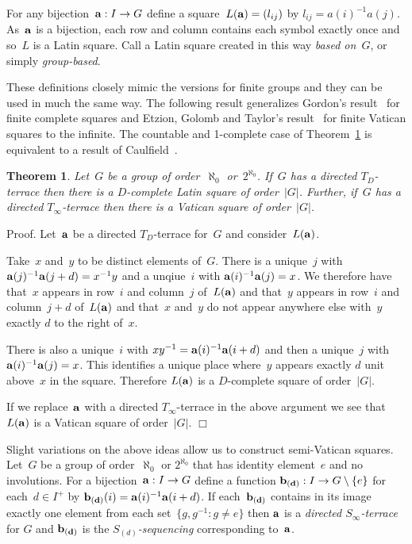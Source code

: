 \documentclass[12pt,a4paper]{article}
\newtheorem{thm}{Theorem}
\newcommand{\qed}{\unskip\protect\nolinebreak\mbox{\quad$\Box$}\vspace{3mm}}
\begin{document}
For any bijection~${\bf a}: I \rightarrow G$ define a square~$L({\bf a}) = (l_{ij})$ by $l_{ij} = a(i)^{-1}a(j)$.   As~${\bf a}$ is a bijection, each row and column contains each symbol exactly once and so~$L$ is a Latin square.  Call a Latin square created in this way {\em based on~$G$}, or simply {\em group-based}.
  
These definitions closely mimic the versions for finite groups and they can be used in much the same way.
The following result generalizes Gordon's result~\cite{Gordon61} for finite complete squares and Etzion, Golomb and Taylor's result~\cite{EGT89} for finite Vatican squares to the infinite.  The countable and 1-complete case of Theorem~\ref{th:gordon} is equivalent to a result of Caulfield~\cite{Caulfield96}.

\begin{thm}\label{th:gordon}
Let~$G$ be a group of order~$\aleph_0$ or~$2^{\aleph_0}$.  If~$G$ has a directed $T_{D}$-terrace then there is a $D$-complete Latin square of order~$|G|$.  Further, if~$G$ has a directed $T_{\infty}$-terrace then there is a Vatican square of order~$|G|$.
\end{thm}

\noindent
Proof.  Let~${\bf a}$ be a directed $T_D$-terrace for~$G$ and consider~$L({\bf a})$.  

Take~$x$ and~$y$ to be distinct elements of~$G$.  There is a unique~$j$ with ${\bf a}(j)^{-1}{\bf a}(j+d) = x^{-1}y$ and a unqiue~$i$ with ${\bf a}(i)^{-1}{\bf a}(j)=x$.  We therefore have that~$x$ appears in row~$i$ and column~$j$ of~$L({\bf a})$ and that~$y$ appears in row~$i$ and column~$j+d$ of~$L({\bf a})$ and that~$x$ and~$y$ do not appear anywhere else with~$y$ exactly $d$  to the right of~$x$.

There is also a unique~$i$ with $xy^{-1} = {\bf a}(i)^{-1}{\bf a}(i+d)$ and then a unique~$j$ with ${\bf a}(i)^{-1}{\bf a}(j)=x$.  This identifies a unique place where~$y$ appears exactly $d$ unit above~$x$ in the square.  Therefore $L({\bf a})$ is a $D$-complete square of order~$|G|$.

If we replace~${\bf a}$ with a directed $T_{\infty}$-terrace in the above argument we see that~$L({\bf a})$ is a Vatican square of order~$|G|$.
\qed

Slight variations on the above ideas allow us to construct semi-Vatican squares.
Let~$G$ be a group of order~$\aleph_0$ or $2^{\aleph_0}$ that has identity element~$e$ and no involutions.  For a bijection~${\bf a}: I \rightarrow G$ define a function  ${\bf b_{(d)}}: I \rightarrow G\setminus\{e\}$ for each~$d \in I^+$ by ${\bf b_{(d)}}(i) = {\bf a}(i)^{-1}{\bf a}(i+d)$.  If each~${\bf b_{(d)}}$ contains in its image exactly one element from each set~$\{ g, g^{-1}  : g \neq e \}$ then ${\bf a}$ is a {\em directed $S_{\infty}$-terrace} for $G$ and ${\bf b_{(d)}}$ is the {\em $S_{(d)}$-sequencing} corresponding to~${\bf a}$.
\end{document}
